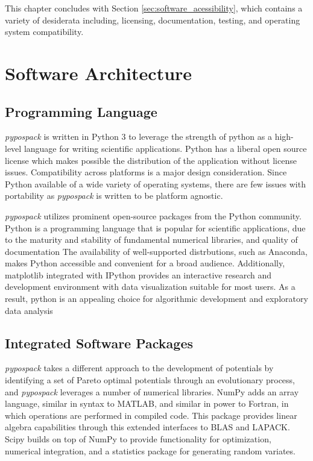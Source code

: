 This chapter concludes with Section \ref{sec:software_acessibility}, which contains a variety of desiderata including, licensing, documentation, testing, and operating system compatibility.

\section{Software Architecture}
\label{sec:software_architecture}

\subsection{Programming Language}
\emph{pypospack} is written in Python 3 to leverage the strength of python as a high-level language for writing scientific applications.  Python has a liberal open source license which makes possible the distribution of the application without license issues. Compatibility across platforms is a major design consideration.  Since Python available of a wide variety of operating systems, there are few issues with portability as \emph{pypospack} is written to be platform agnostic.

\emph{pypospack} utilizes prominent open-source packages from the Python community.  Python is a programming language that is popular for scientific applications, due to the maturity and stability of fundamental numerical libraries, and quality of documentation  The availability of well-supported distrbutions, such as Anaconda\cite{python_anaconda}, makes Python accessible and convenient for a broad audience.  Additionally, matplotlib\cite{hunter2007_matplotlib} integrated with IPython provides an interactive research and development environment with data visualization suitable for most users.  As a result, python is an appealing choice for algorithmic development and exploratory data analysis\cite{dubois2007_python}

\subsection{Integrated Software Packages}

\emph{pypospack} takes a different approach to the development of potentials by identifying a set of Pareto optimal potentials through an evolutionary process, and \emph{pypospack} leverages a number of numerical libraries.  NumPy\cite{walt2011_numpy} adds an array language, similar in syntax to MATLAB, and similar in power to Fortran, in which operations are performed in compiled code.  This package provides linear algebra capabilities through this extended interfaces to BLAS\cite{blas2002} and LAPACK\cite{anderson1990_lapack}.  Scipy\cite{jones_scipy} builds on top of NumPy to provide functionality for optimization, numerical integration, and a statistics package for generating random variates.

